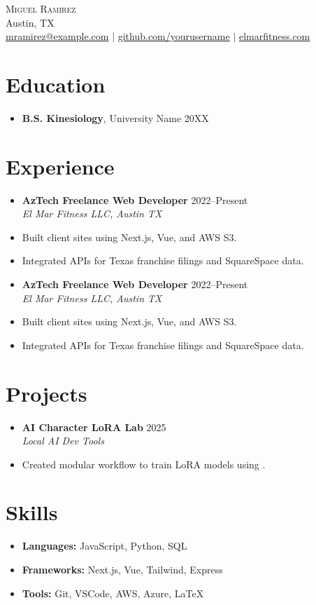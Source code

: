 \documentclass[letterpaper,10pt]{article}
\newcommand{\resumeItem}[1]{\item\small{#1}}
\newcommand{\resumeSubheading}[4]{
  \vspace{-1pt}\item
    \textbf{#1} \hfill #2 \\
    \textit{\small#3} \hfill \textit{\small #4}
}
\begin{document}
\begin{center}
  {\Huge \scshape Miguel Ramirez} \\ \vspace{1pt}
  Austin, TX \\ 
  \href{mailto:mramirez@example.com}{mramirez@example.com} $|$
  \href{https://github.com/yourusername}{github.com/yourusername} $|$
  \href{https://elmarfitness.com}{elmarfitness.com}
\end{center}

\section*{Education}
\begin{itemize}[leftmargin=0.15in]
  \item[]
    \textbf{B.S. Kinesiology}, University Name \hfill 20XX
\end{itemize}

\section*{Experience}
\begin{itemize}[leftmargin=0.15in]
  \resumeSubheading
    {AzTech Freelance Web Developer}{2022–Present}
    {El Mar Fitness LLC, Austin TX}{}
    \resumeItem{Built client sites using Next.js, Vue, and AWS S3.}
    \resumeItem{Integrated APIs for Texas franchise filings and SquareSpace data.}
  \resumeSubheading
    {AzTech Freelance Web Developer}{2022–Present}
    {El Mar Fitness LLC, Austin TX}{}
    \resumeItem{Built client sites using Next.js, Vue, and AWS S3.}
    \resumeItem{Integrated APIs for Texas franchise filings and SquareSpace data.}
\end{itemize}

\section*{Projects}
\begin{itemize}[leftmargin=0.15in]
  \resumeSubheading
    {AI Character LoRA Lab}{2025}
    {Local AI Dev Tools}{}
    \resumeItem{Created modular workflow to train LoRA models using \texttt{\detokenize{kohya_ss}}.}
\end{itemize}

\section*{Skills}
\begin{itemize}[leftmargin=0.15in, label={}]
  \item \textbf{Languages:} JavaScript, Python, SQL
  \item \textbf{Frameworks:} Next.js, Vue, Tailwind, Express
  \item \textbf{Tools:} Git, VSCode, AWS, Azure, LaTeX
\end{itemize}
\end{document}
